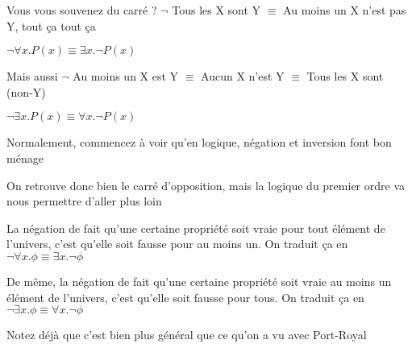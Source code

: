 \begin{frame}

Vous vous souvenez du carré ? \pause $\neg $ Tous les X sont Y $\equiv$ Au moins un X n'est pas Y, tout ça tout ça\pause\newline

$\neg \forall x. P(x) \equiv $\pause $\exists x. \neg P(x)$\pause\newline

Mais aussi $\neg$ Au moins un X est Y $\equiv$ Aucun X n'est Y \pause $\equiv$ Tous les X sont (non-Y)\pause\newline

$\neg \exists x. P(x) \equiv $\pause $\forall x. \neg P(x)$\pause\newline

Normalement, commencez à voir qu'en logique, négation et inversion font bon ménage

\end{frame}



\begin{frame}

On retrouve donc bien le carré d'opposition, mais la logique du premier ordre va nous permettre d'aller plus loin\pause\newline

La négation de fait qu'une certaine propriété soit vraie pour tout élément de l'univers, c'est qu'elle soit fausse pour au moins un. \pause On traduit ça en $\neg \forall x. \phi \equiv \exists x. \neg \phi$\pause\newline

De même, la négation de fait qu'une certaine propriété soit vraie au moins un élément de l'univers, c'est qu'elle soit fausse pour tous. \pause On traduit ça en $\neg \exists x. \phi \equiv \forall x. \neg \phi$\pause\newline

Notez déjà que c'est bien plus général que ce qu'on a vu avec Port-Royal

\end{frame}




